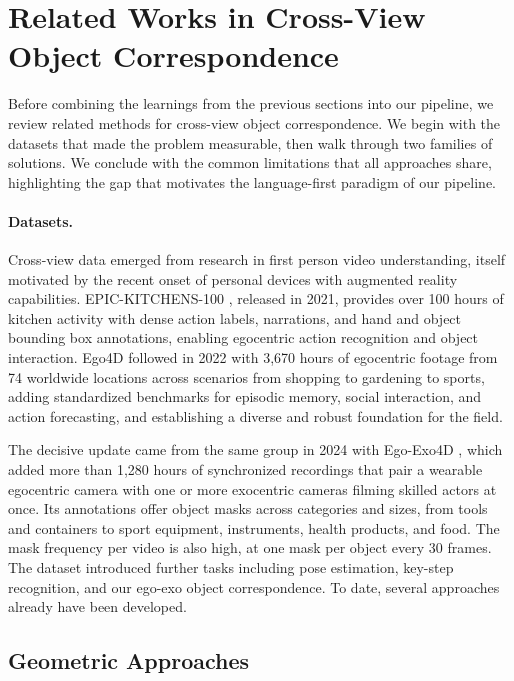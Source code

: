 \section{Related Works in Cross-View Object Correspondence}
\label{sec:related-works}

Before combining the learnings from the previous sections into our pipeline, we review related methods for cross-view object correspondence. We begin with the datasets that made the problem measurable, then walk through two families of solutions. We conclude with the common limitations that all approaches share, highlighting the gap that motivates the language-first paradigm of our pipeline.

\paragraph{Datasets.} \label{par:datasets} Cross-view data emerged from research in first person video understanding, itself motivated by the recent onset of personal devices with augmented reality capabilities. EPIC-KITCHENS-100 \cite{damen2021epickitchens100}, released in 2021, provides over 100 hours of kitchen activity with dense action labels, narrations, and hand and object bounding box annotations, enabling egocentric action recognition and object interaction. Ego4D \cite{grauman2022ego4d} followed in 2022 with 3,670 hours of egocentric footage from 74 worldwide locations across scenarios from shopping to gardening to sports, adding standardized benchmarks for episodic memory, social interaction, and action forecasting, and establishing a diverse and robust foundation for the field.

The decisive update came from the same group in 2024 with Ego-Exo4D \cite{grauman2024egoexo4d}, which added more than 1,280 hours of synchronized recordings that pair a wearable egocentric camera with one or more exocentric cameras filming skilled actors at once. Its annotations offer object masks across categories and sizes, from tools and containers to sport equipment, instruments, health products, and food. The mask frequency per video is also high, at one mask per object every 30 frames. The dataset introduced further tasks including pose estimation, key-step recognition, and our ego-exo object correspondence. To date, several approaches already have been developed.

\subsection{Geometric Approaches}
\label{subsec:matching}
